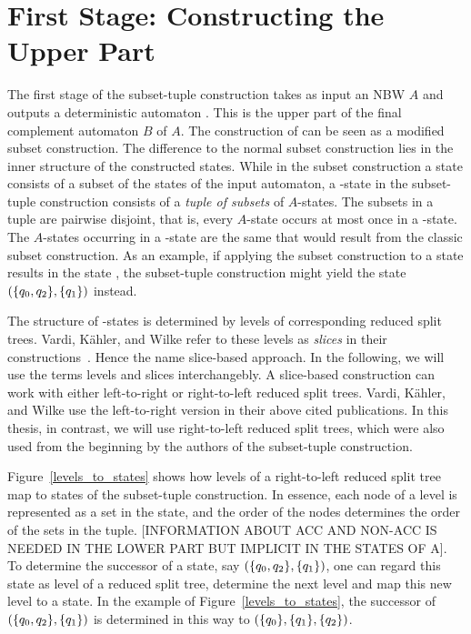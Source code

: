 \section{First Stage: Constructing the Upper Part}
The first stage of the subset-tuple construction takes as input an NBW $A$ and outputs a deterministic automaton \Bp. This \Bp is the upper part of the final complement automaton $B$ of $A$. The construction of \Bp can be seen as a modified subset construction. The difference to the normal subset construction lies in the inner structure of the constructed states. While in the subset construction a state consists of a subset of the states of the input automaton, a \Bp-state in the subset-tuple construction consists of a \emph{tuple of subsets} of $A$-states. The subsets in a tuple are pairwise disjoint, that is, every $A$-state occurs at most once in a \Bp-state. The $A$-states occurring in a \Bp-state are the same that would result from the classic subset construction. As an example, if applying the subset construction to a state  results in the state , the subset-tuple construction might yield the state $(\{q_{0},q_{2}\},\{q_{1}\})$ instead.

The structure of \Bp-states is determined by levels of corresponding reduced split trees. Vardi, Kähler, and Wilke refer to these levels as \emph{slices} in their constructions~\cite{vardi2007automata,2008_kaehler}. Hence the name slice-based approach. In the following, we will use the terms levels and slices interchangebly. A slice-based construction can work with either left-to-right or right-to-left reduced split trees. Vardi, Kähler, and Wilke use the left-to-right version in their above cited publications. In this thesis, in contrast, we will use right-to-left reduced split trees, which were also used from the beginning by the authors of the subset-tuple construction.

Figure~\ref{levels_to_states} shows how levels of a right-to-left reduced split tree map to states of the subset-tuple construction. In essence, each node of a level is represented as a set in the state, and the order of the nodes determines the order of the sets in the tuple. [INFORMATION ABOUT ACC AND NON-ACC IS NEEDED IN THE LOWER PART BUT IMPLICIT IN THE STATES OF A]. To determine the successor of a state, say $(\{q_{0},q_{2}\},\{q_{1}\})$, one can regard this state as level of a reduced split tree, determine the next level and map this new level to a state. In the example of Figure~\ref{levels_to_states}, the successor of $(\{q_{0},q_{2}\},\{q_{1}\})$ is determined in this way to $(\{q_{0}\},\{q_{1}\},\{q_{2}\})$.

